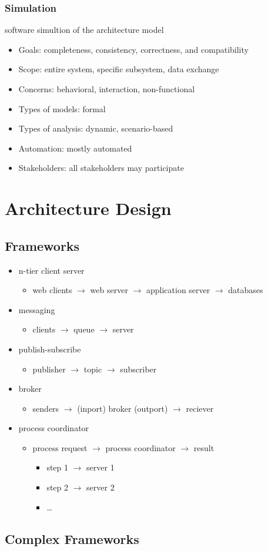 \documentclass[]{article}
\theoremstyle{definition}
\begin{document}
	\subsubsection{Simulation}
	software simultion of the architecture model
	\begin{itemize}
		\item Goals: completeness, consistency, correctness, and compatibility
		\item Scope: entire system, specific subsystem, data exchange
		\item Concerns: behavioral, interaction, non-functional
		\item Types of models: formal
		\item Types of analysis: dynamic, scenario-based
		\item Automation: mostly automated
		\item Stakeholders: all stakeholders may participate
	\end{itemize}

	\section{Architecture Design}
	\subsection{Frameworks}
	\begin{itemize}
		\item n-tier client server
			\begin{itemize}
				\item web clients $\rightarrow$ web server $\rightarrow$ application server $\rightarrow$ databases
			\end{itemize}
		\item messaging
			\begin{itemize}
				\item clients $\rightarrow$ queue $\rightarrow$ server
			\end{itemize}
		\item publish-subscribe
			\begin{itemize}
				\item publisher $\rightarrow$ topic $\rightarrow$ subscriber
			\end{itemize}
		\item broker
			\begin{itemize}
				\item senders $\rightarrow$ (inport) broker (outport) $\rightarrow$ reciever
			\end{itemize}
		\item process coordinator
			\begin{itemize}
				\item process request $\rightarrow$ process coordinator $\rightarrow$ result
					\begin{itemize}
						\item step 1 $\rightarrow$ server 1
						\item step 2 $\rightarrow$ server 2
						\item \dots
					\end{itemize}
			\end{itemize}
	\end{itemize}

	\subsection{Complex Frameworks}
\end{document}
